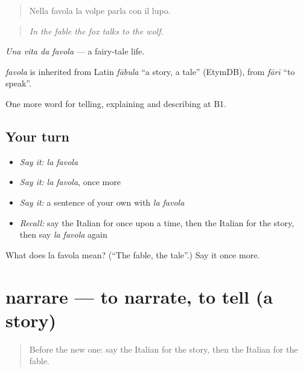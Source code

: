 \begin{quote}
Nella favola la volpe parla con il lupo.
\end{quote}

\begin{quote}
\emph{In the fable the fox talks to the wolf.}
\end{quote}

\emph{Una vita da favola} — a fairy-tale life.

\begin{cousinweb}
\emph{favola} is inherited from Latin \emph{fābula} \textquotedblleft{}a story, a tale\textquotedblright{} (EtymDB), from \emph{fārī} \textquotedblleft{}to speak\textquotedblright{}.
\end{cousinweb}

\begin{grammarlens}[title={What you've built}]
One more word for telling, explaining and describing at B1.
\end{grammarlens}

\subsection*{Your turn}
\begin{itemize}
\raggedright
  \item \emph{Say it:} \emph{la favola}
  \item \emph{Say it:} \emph{la favola}, once more
  \item \emph{Say it:} a sentence of your own with \emph{la favola}
  \item \emph{Recall:} say the Italian for once upon a time, then the Italian for the story, then say \emph{la favola} again
\end{itemize}

\begin{tcolorbox}[breakable,colback=teal!4,colframe=teal!35!black,title={Before you move on}]
What does la favola mean? (\textquotedblleft{}The fable, the tale\textquotedblright{}.) Say it once more.
\end{tcolorbox}
\section[narrare]{narrare — to narrate, to tell (a story)}

\label{lesson:IT-C323-narrare}



\begin{quote}
Before the new one: say the Italian for the story, then the Italian for the fable.
\end{quote}

